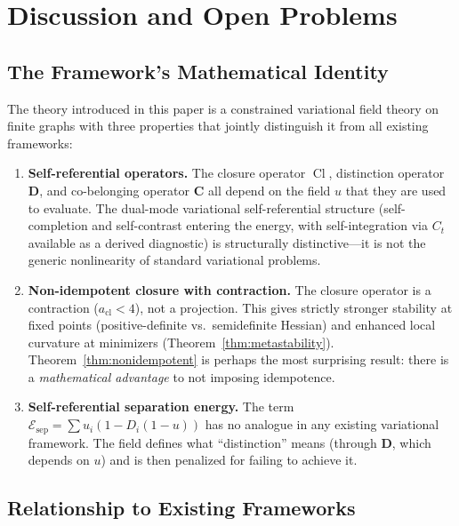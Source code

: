 \documentclass[lettersize,journal]{IEEEtran}
\DeclareMathOperator{\Cl}{Cl}
\begin{document}
\section{Discussion and Open Problems}
\label{sec:discussion}

\subsection{The Framework's Mathematical Identity}

The theory introduced in this paper is a constrained variational field theory on finite graphs with three properties that jointly distinguish it from all existing frameworks:

\begin{enumerate}
\item \textbf{Self-referential operators.} The closure operator $\Cl$, distinction operator $\mathbf{D}$, and co-belonging operator $\mathbf{C}$ all depend on the field $u$ that they are used to evaluate. The dual-mode variational self-referential structure (self-completion and self-contrast entering the energy, with self-integration via $C_t$ available as a derived diagnostic) is structurally distinctive---it is not the generic nonlinearity of standard variational problems.

\item \textbf{Non-idempotent closure with contraction.} The closure operator is a contraction ($a_{\mathrm{cl}} < 4$), not a projection. This gives strictly stronger stability at fixed points (positive-definite vs.\ semidefinite Hessian) and enhanced local curvature at minimizers (Theorem~\ref{thm:metastability}). Theorem~\ref{thm:nonidempotent} is perhaps the most surprising result: there is a \emph{mathematical advantage} to not imposing idempotence.

\item \textbf{Self-referential separation energy.} The term $\mathcal{E}_{\mathrm{sep}} = \sum u_i(1 - D_i(1-u))$ has no analogue in any existing variational framework. The field defines what ``distinction'' means (through $\mathbf{D}$, which depends on $u$) and is then penalized for failing to achieve it.
\end{enumerate}

\subsection{Relationship to Existing Frameworks}
\end{document}
